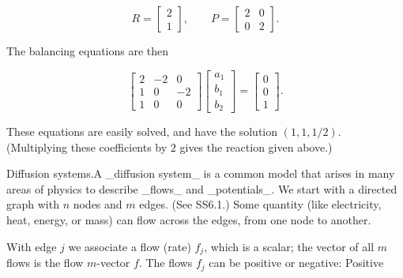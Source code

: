\[R=\left[\begin{array}{c}2\\ 1\end{array}\right],\qquad P=\left[\begin{array}{cc}2&0\\ 0&2\end{array}\right].\]

The balancing equations are then

\[\left[\begin{array}{ccc}2&-2&0\\ 1&0&-2\\ 1&0&0\end{array}\right]\left[\begin{array}{c}a_{1}\\ b_{1}\\ b_{2}\end{array}\right]=\left[\begin{array}{c}0\\ 0\\ 1\end{array}\right].\]

These equations are easily solved, and have the solution \((1,1,1/2)\). (Multiplying these coefficients by \(2\) gives the reaction given above.)

Diffusion systems.A _diffusion system_ is a common model that arises in many areas of physics to describe _flows_ and _potentials_. We start with a directed graph with \(n\) nodes and \(m\) edges. (See SS6.1.) Some quantity (like electricity, heat, energy, or mass) can flow across the edges, from one node to another.

With edge \(j\) we associate a flow (rate) \(f_{j}\), which is a scalar; the vector of all \(m\) flows is the flow \(m\)-vector \(f\). The flows \(f_{j}\) can be positive or negative: Positive 
